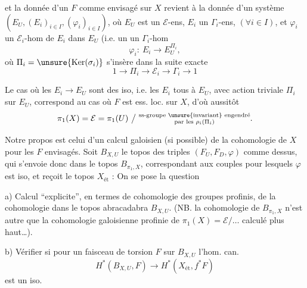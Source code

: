 et la donnée d'un $F$ comme envisagé sur
$X$ revient à la donnée d'un système
$(E_U,(E_i)_{i\in I},(\varphi_i)_{i\in I})$, où $E_U$ est un $\mathcal E$-ens,
$E_i$ un $\Gamma_i$-ens, $(\forall i\in I)$, et $\varphi_i$ un
$\mathcal E_i$-hom de $E_i$ dans $E_U$ (i.e. un
un $\Gamma_i$-hom
\[
\varphi_i:\ E_i\longrightarrow E_U^{\Pi_i},
\]
où  $\Pi_i=\unsure{\operatorname{Ker}(\sigma_i)}$ s'insère dans la suite exacte
\[
1\longrightarrow\Pi_i\longrightarrow\mathcal E_i\longrightarrow\Gamma_i\longrightarrow1
\]

Le cas où les $E_i\longrightarrow E_U$ sont des iso,
i.e. les $E_i$   tous à $E_U$,
avec action triviale  $\Pi_i$ sur $E_U$, correspond
au cas où $F$ est ess. loc.  sur $X$,
d'où aussitôt
\[
\pi_1(X)=\mathcal E=\pi_1(U)\ \big/\
\substack{\text{ss-groupe \unsure{invariant} engendré}\\
\text{par les }\rho_i(\Pi_i)}.
\]

Notre propos est celui d'un calcul galoisien
(si possible) de la cohomologie de $X$ pour
les $F$ envisagés.
Soit $B_{X,U}$ le topos  des triples
$(F_U,F_D,\varphi)$ comme dessus, qui s'envoie
donc dans le topos $B_{\pi_1,X}$, correspondant
aux couples pour lesquels $\varphi$ est iso,
et reçoit le topos $X_{\mathrm{ét}}$ :
\diagram{\begin{tikzcd}
X_{\mathrm{ét}} \arrow[r,"f"] & B_{X,U} \arrow[r,"g"] & B_{\pi_1,X}
\end{tikzcd}}
On se pose la question

a) Calcul ``explicite'', en termes de cohomologie
des groupes profinis, de la cohomologie
dans le topos abracadabra $B_{X,U}$. (NB.
 la cohomologie  de
$B_{\pi_1,X}$ n'est autre que la cohomologie
galoisienne profinie de $\pi_1(X)=\mathcal E/\ldots$
calculé plus haut\ldots).

b) Vérifier si pour un faisceau de
torsion $F$ sur $B_{X,U}$ l'hom. can.
\[
H^{*}(B_{X,U},F)\longrightarrow
H^{*}(X_{\mathrm{ét}},f^{*}F)
\]
est un iso.

